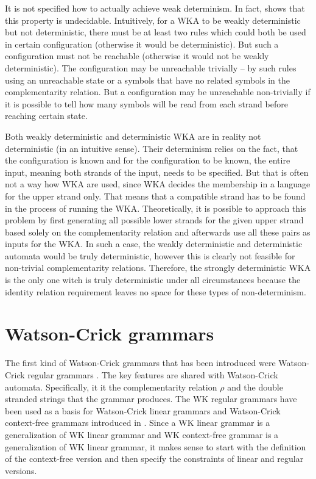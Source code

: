 It is not specified how to actually achieve weak determinism. In fact, \cite{DETERM_WKA} shows that this property is undecidable. Intuitively, for a WKA to be weakly deterministic but not deterministic, there must be at least two rules which could both be used in certain configuration (otherwise it would be deterministic). But such a configuration must not be reachable (otherwise it would not be weakly deterministic). The configuration may be unreachable trivially -- by such rules using an unreachable state or a symbols that have no related symbols in the complementarity relation. But a configuration may be unreachable non-trivially if it is possible to tell how many symbols will be read from each strand before reaching certain state.

Both weakly deterministic and deterministic WKA are in reality not deterministic (in an intuitive sense). Their determinism relies on the fact, that the configuration is known and for the configuration to be known, the entire input, meaning both strands of the input, needs to be specified. But that is often not a way how WKA are used, since WKA decides the membership in a language for the upper strand only. That means that a compatible strand has to be found in the process of running the WKA. Theoretically, it is possible to approach this problem by first generating all possible lower strands for the given upper strand based solely on the complementarity relation and afterwards use all these pairs as inputs for the WKA. In such a case, the weakly deterministic and deterministic automata would be truly deterministic, however this is clearly not feasible for non-trivial complementarity relations. Therefore, the strongly deterministic WKA is the only one witch is truly deterministic under all circumstances because the identity relation requirement leaves no space for these types of non-determinism.

\section{Watson-Crick grammars}
The first kind of Watson-Crick grammars that has been introduced were Watson-Crick regular grammars \cite{REG_GRAMMAR}. The key features are shared with Watson-Crick automata. Specifically, it it the complementarity relation $\rho$ and the double stranded strings that the grammar produces.
The WK regular grammars have been used as a basis for Watson-Crick linear grammars and Watson-Crick context-free grammars introduced in \cite{WK_GRAMMARS_1}. Since a WK linear grammar is a generalization of WK linear grammar and WK context-free grammar is a generalization of WK linear grammar, it makes sense to start with the definition of the context-free version and then specify the constraints of linear and regular versions.

